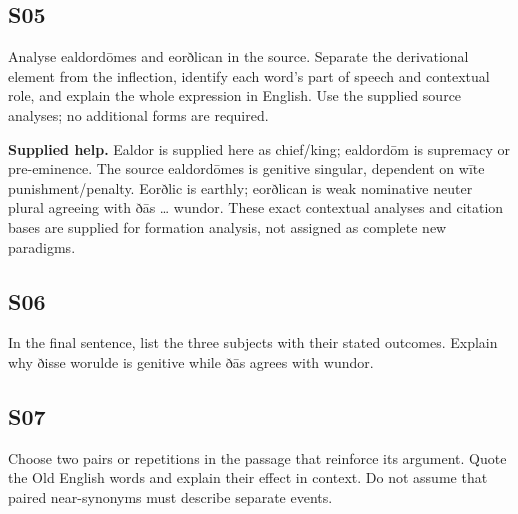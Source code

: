 \par\begin{minipage}{\linewidth}\raggedright
\subsection*{S05}

Analyse ealdordōmes and eorðlican in the source. Separate the derivational element from the inflection, identify each word’s part of speech and contextual role, and explain the whole expression in English. Use the supplied source analyses; no additional forms are required.

\end{minipage}\par\addvspace{4pt}

\textbf{Supplied help.} Ealdor is supplied here as chief/\allowbreak{}king; ealdordōm is supremacy or pre-eminence. The source ealdordōmes is genitive singular, dependent on wīte punishment/\allowbreak{}penalty. Eorðlic is earthly; eorðlican is weak nominative neuter plural agreeing with ðās … wundor. These exact contextual analyses and citation bases are supplied for formation analysis, not assigned as complete new paradigms.

\par\begin{minipage}{\linewidth}\raggedright
\subsection*{S06}

In the final sentence, list the three subjects with their stated outcomes. Explain why ðisse worulde is genitive while ðās agrees with wundor.

\end{minipage}\par\addvspace{4pt}

\par\begin{minipage}{\linewidth}\raggedright
\subsection*{S07}

Choose two pairs or repetitions in the passage that reinforce its argument. Quote the Old English words and explain their effect in context. Do not assume that paired near-synonyms must describe separate events.

\end{minipage}\par\addvspace{4pt}

